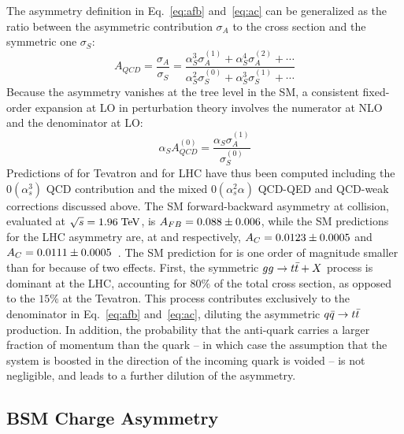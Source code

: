 The asymmetry definition in Eq.~\ref{eq:afb} and~\ref{eq:ac} can be
generalized as the ratio between the asymmetric contribution
$\sigma_A$ to the cross section and the symmetric one $\sigma_S$:
\begin{equation}
  A_{QCD} = \frac{\sigma_A}{\sigma_S} = 
  \frac{\alpha_S^3\sigma_A^{(1)}+\alpha_S^4\sigma_A^{(2)}+\cdots{}}
  {\alpha_S^2\sigma_S^{(0)}+\alpha_S^3\sigma_S^{(1)}+\cdots{}}
\end{equation}
Because the asymmetry vanishes at the tree level in the SM, a
consistent fixed-order expansion at LO in perturbation theory involves the
numerator at NLO and the denominator at LO:
\begin{equation}
  \alpha_SA_{QCD}^{(0)}=\frac{\alpha_S\sigma_A^{(1)}}{\sigma_S^{(0)}}
\end{equation}
Predictions of \afb{} for Tevatron and \ac{} for LHC have thus been
computed including the $\mathcal{0}(\alpha_s^3)$
QCD contribution and the mixed $\mathcal{0}(\alpha_s^2\alpha)$ QCD-QED
and QCD-weak corrections discussed above. The SM forward-backward
asymmetry at \ppbar{} collision, evaluated at $\sqrt{s}=1.96\; \mathrm{TeV}{}$,
is $\mbox{$A_{FB}$}{} = 0.088\pm{}0.006$, while the SM predictions for the LHC
asymmetry are, at \seventev{} and \eighttev{} respectively,
$\mbox{$A_C$}{}=0.0123\pm{}0.0005$ and
$\mbox{$A_C$}{}=0.0111\pm0.0005$~\cite{Bernreuther:2012sx}. 
The SM prediction for \ac{} is one order of magnitude smaller than for
\afb{} because of two effects. First, the symmetric $gg\to\mbox{$t\bar{t}$}{}+X$
process is dominant at the LHC, accounting for $80\%$ of the total
cross section, as opposed to the $15\%$ at the Tevatron. This process
contributes exclusively to the denominator in Eq.~\ref{eq:afb}
and~\ref{eq:ac}, diluting the asymmetric $\mbox{$q\bar{q}$}{}\to\mbox{$t\bar{t}$}{}$
production. In addition, the probability that the anti-quark carries a
larger fraction of momentum than the quark -- in which case the
assumption that the \ttbar{} system is boosted in the direction of the
incoming quark is voided -- is not negligible, and leads to a further
dilution of the asymmetry.  

\subsection{BSM Charge Asymmetry}
\label{sec:qcdca}
